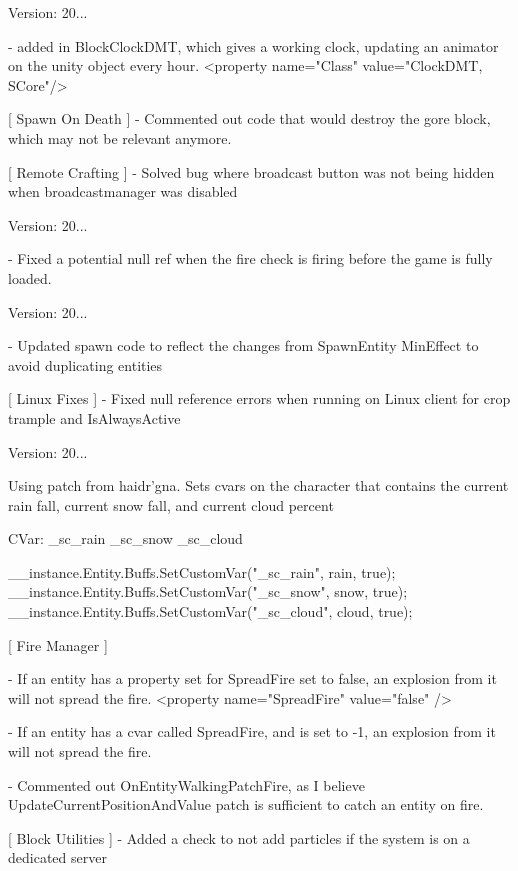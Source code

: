 Version\+: 20... \begin{DoxyVerb}[ BlockClockDMT ]
    - added in BlockClockDMT, which gives a working clock, updating an animator on the unity object every hour.
          <property name="Class" value="ClockDMT, SCore"/>

[ Spawn On Death ]
    - Commented out code that would destroy the gore block, which may not be relevant anymore.

[ Remote Crafting ]
    - Solved bug where broadcast button was not being hidden when broadcastmanager was disabled
\end{DoxyVerb}
 Version\+: 20... \begin{DoxyVerb}
    - Fixed a potential null ref when the fire check is firing before the game is fully loaded.
\end{DoxyVerb}
 Version\+: 20... \begin{DoxyVerb}
    - Updated spawn code to reflect the changes from SpawnEntity MinEffect to avoid duplicating entities

[ Linux Fixes ]
    - Fixed null reference errors when running on Linux client for crop trample and IsAlwaysActive
\end{DoxyVerb}
 Version\+: 20... \begin{DoxyVerb}
    Using patch from haidr'gna.  Sets cvars on the character that contains the current rain fall, current snow fall, and current cloud percent

    CVar:
        _sc_rain
        _sc_snow
        _sc_cloud

        __instance.Entity.Buffs.SetCustomVar("_sc_rain", rain, true);
        __instance.Entity.Buffs.SetCustomVar("_sc_snow", snow, true);
        __instance.Entity.Buffs.SetCustomVar("_sc_cloud", cloud, true);

[ Fire Manager ]

    - If an entity has a property set for SpreadFire set to false, an explosion from it will not spread the fire.
        <property name="SpreadFire" value="false" />

    - If an entity has a cvar called SpreadFire, and is set to -1, an explosion from it will not spread the fire.

    - Commented out OnEntityWalkingPatchFire, as I believe UpdateCurrentPositionAndValue patch is sufficient to catch an entity on fire.

[ Block Utilities ]
    - Added a check to not add particles if the system is on a dedicated server
\end{DoxyVerb}


